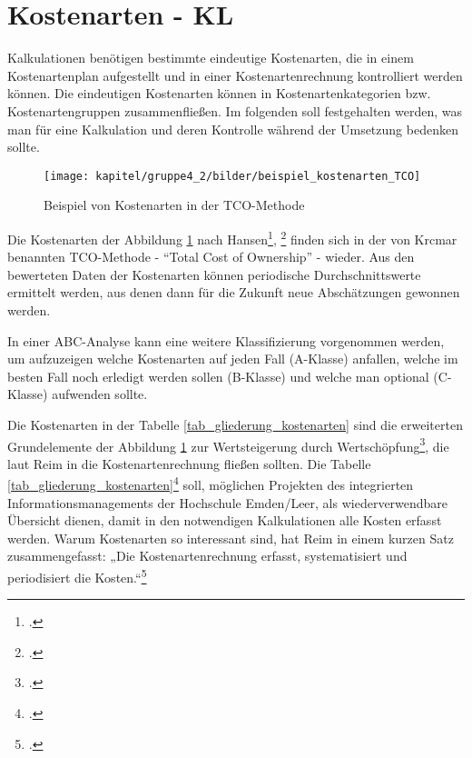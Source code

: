 
\section{Kostenarten - KL}

\label{section_kostenarten}
Kalkulationen benötigen bestimmte eindeutige Kostenarten, die in einem Kostenartenplan aufgestellt und in einer Kostenartenrechnung kontrolliert werden können. Die eindeutigen Kostenarten können in Kostenartenkategorien bzw. Kostenartengruppen zusammenfließen. Im folgenden soll festgehalten werden, was man für eine Kalkulation und deren Kontrolle w\"ahrend der Umsetzung bedenken sollte.

\begin{figure}[h!]
	\centering
	\texttt{[image: kapitel/gruppe4\_2/bilder/beispiel\_kostenarten\_TCO]}
	\caption{Beispiel von Kostenarten in der TCO-Methode}
	\label{fig_kostenarten_TCO}
\end{figure}

Die Kostenarten der Abbildung \ref{fig_kostenarten_TCO} nach Hansen\footcite[495]{hansen_business_2009}, \footcite[Vgl.][314, 355]{muller2013betriebswirtschaftslehre} finden sich in der von Krcmar benannten TCO-Methode - \enquote{Total Cost of Ownership} - wieder. Aus den bewerteten Daten der Kostenarten können periodische Durchschnittswerte ermittelt werden, aus denen dann für die Zukunft neue Abschätzungen gewonnen werden.


In einer ABC-Analyse kann eine weitere Klassifizierung vorgenommen werden, um aufzuzeigen welche Kostenarten auf jeden Fall (A-Klasse) anfallen, welche im besten Fall noch erledigt werden sollen (B-Klasse) und welche man optional (C-Klasse) aufwenden sollte.

Die Kostenarten in der Tabelle \ref{tab_gliederung_kostenarten} sind die erweiterten Grundelemente der Abbildung \ref{fig_kostenarten_TCO} zur Wertsteigerung durch Wertschöpfung\footcite[125-128]{reim_erfolgsrechnung_2015}, die laut Reim in die Kostenartenrechnung fließen sollten. Die Tabelle \ref{tab_gliederung_kostenarten}\footcite[138]{reim_erfolgsrechnung_2015} soll, m\"oglichen Projekten des integrierten Informationsmanagements der Hochschule Emden/Leer, als wiederverwendbare Übersicht dienen, damit in den notwendigen Kalkulationen alle Kosten erfasst werden. Warum Kostenarten so interessant sind, hat Reim in einem kurzen Satz zusammengefasst: „Die Kostenartenrechnung erfasst, systematisiert und periodisiert die Kosten.“\footcite[137-147]{reim_erfolgsrechnung_2015}

